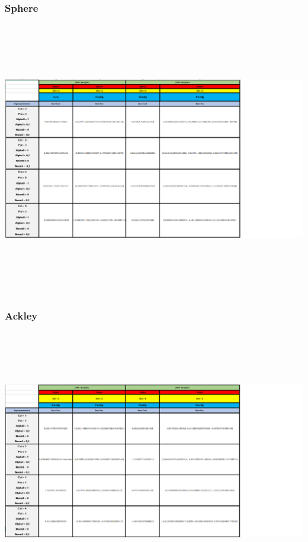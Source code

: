 \documentclass[10pt]{article}
\begin{document}
\subsubsection{Sphere}\label{sec:comp-PSO}
  \includegraphics[height=12cm]{img/Fireflysphere.png}

\subsubsection{Ackley}\label{sec:comp-PSO}
  \includegraphics[height=11.5cm]{img/Fireflyackley.png}
\end{document}
